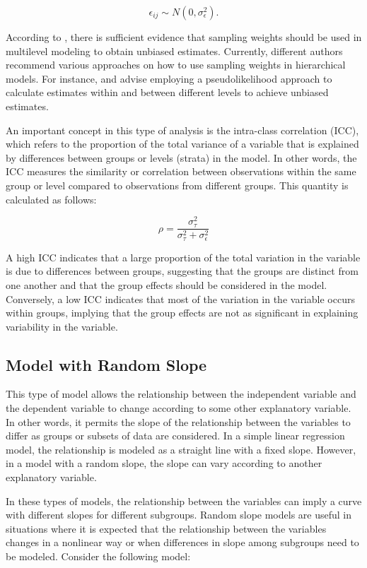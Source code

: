 \documentclass[
  12pt,
]{book}
\begin{document}
\[
\epsilon_{ij} \sim N(0, \sigma_{\epsilon}^{2}).
\]

According to \citet{cai2013investigation}, there is sufficient evidence that sampling weights should be used in multilevel modeling to obtain unbiased estimates. Currently, different authors recommend various approaches on how to use sampling weights in hierarchical models. For instance, \citet{pfeffermann1998weighting} and \citet{asparouhov2006general} advise employing a pseudolikelihood approach to calculate estimates within and between different levels to achieve unbiased estimates.

An important concept in this type of analysis is the intra-class correlation (ICC), which refers to the proportion of the total variance of a variable that is explained by differences between groups or levels (strata) in the model. In other words, the ICC measures the similarity or correlation between observations within the same group or level compared to observations from different groups. This quantity is calculated as follows:

\[
\rho = \frac{\sigma_{\tau}^{2}}{\sigma_{\tau}^{2} + \sigma_{\epsilon}^{2}}
\]

A high ICC indicates that a large proportion of the total variation in the variable is due to differences between groups, suggesting that the groups are distinct from one another and that the group effects should be considered in the model. Conversely, a low ICC indicates that most of the variation in the variable occurs within groups, implying that the group effects are not as significant in explaining variability in the variable.

\hypertarget{model-with-random-slope}{%
\subsection{Model with Random Slope}\label{model-with-random-slope}}

This type of model allows the relationship between the independent variable and the dependent variable to change according to some other explanatory variable. In other words, it permits the slope of the relationship between the variables to differ as groups or subsets of data are considered. In a simple linear regression model, the relationship is modeled as a straight line with a fixed slope. However, in a model with a random slope, the slope can vary according to another explanatory variable.

In these types of models, the relationship between the variables can imply a curve with different slopes for different subgroups. Random slope models are useful in situations where it is expected that the relationship between the variables changes in a nonlinear way or when differences in slope among subgroups need to be modeled. Consider the following model:
\end{document}
